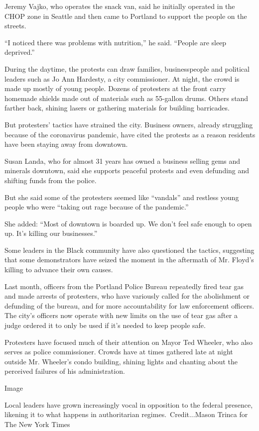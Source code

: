 Jeremy Vajko, who operates the snack van, said he initially operated in
the CHOP zone in Seattle and then came to Portland to support the people
on the streets.

``I noticed there was problems with nutrition,'' he said. ``People are
sleep deprived.''

During the daytime, the protests can draw families, businesspeople and
political leaders such as Jo Ann Hardesty, a city commissioner. At
night, the crowd is made up mostly of young people. Dozens of protesters
at the front carry homemade shields made out of materials such as
55-gallon drums. Others stand farther back, shining lasers or gathering
materials for building barricades.

But protesters' tactics have strained the city. Business owners, already
struggling because of the coronavirus pandemic, have cited the protests
as a reason residents have been staying away from downtown.

Susan Landa, who for almost 31 years has owned a business selling gems
and minerals downtown, said she supports peaceful protests and even
defunding and shifting funds from the police.

But she said some of the protesters seemed like ``vandals'' and restless
young people who were ``taking out rage because of the pandemic.''

She added: ``Most of downtown is boarded up. We don't feel safe enough
to open up. It's killing our businesses.''

Some leaders in the Black community have also questioned the tactics,
suggesting that some demonstrators have seized the moment in the
aftermath of Mr. Floyd's killing to advance their own causes.

Last month, officers from the Portland Police Bureau repeatedly fired
tear gas and made arrests of protesters, who have variously called for
the abolishment or defunding of the bureau, and for more accountability
for law enforcement officers. The city's officers now operate with new
limits on the use of tear gas after a judge ordered it to only be used
if it's needed to keep people safe.

Protesters have focused much of their attention on Mayor Ted Wheeler,
who also serves as police commissioner. Crowds have at times gathered
late at night outside Mr. Wheeler's condo building, shining lights and
chanting about the perceived failures of his administration.

Image

Local leaders have grown increasingly vocal in opposition to the federal
presence, likening it to what happens in authoritarian
regimes.~Credit...Mason Trinca for The New York Times

